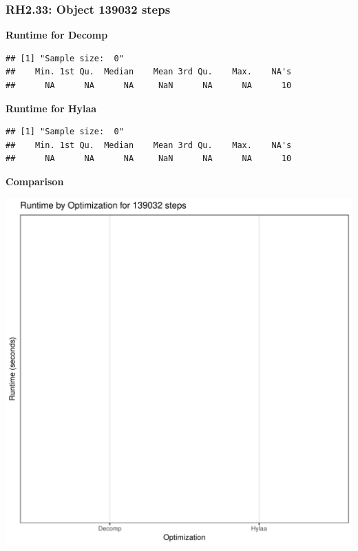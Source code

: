 \documentclass{article}\usepackage[]{graphicx}\usepackage[]{color}
\makeatletter
\def\maxwidth{ %
  \ifdim\Gin@nat@width>\linewidth
    \linewidth
  \else
    \Gin@nat@width
  \fi
}
\newenvironment{kframe}{%
 \def\at@end@of@kframe{}%
 \ifinner\ifhmode%
  \def\at@end@of@kframe{\end{minipage}}%
  \begin{minipage}{\columnwidth}%
 \fi\fi%
 \def\FrameCommand##1{\hskip\@totalleftmargin \hskip-\fboxsep
 \colorbox{shadecolor}{##1}\hskip-\fboxsep
     \hskip-\linewidth \hskip-\@totalleftmargin \hskip\columnwidth}%
 \MakeFramed {\advance\hsize-\width
   \@totalleftmargin\z@ \linewidth\hsize
   \@setminipage}}%
 {\par\unskip\endMakeFramed%
 \at@end@of@kframe}
\newenvironment{knitrout}{}{} %
\makeatother
\begin{document}
\subsubsection{RH2.33: Object 139032 steps}

 \textbf{Runtime for Decomp}
\begin{knitrout}
\color{fgcolor}\begin{kframe}
\begin{verbatim}
## [1] "Sample size:  0"
##    Min. 1st Qu.  Median    Mean 3rd Qu.    Max.    NA's 
##      NA      NA      NA     NaN      NA      NA      10
\end{verbatim}
\end{kframe}
\end{knitrout}
 \textbf{Runtime for Hylaa}
\begin{knitrout}
\color{fgcolor}\begin{kframe}
\begin{verbatim}
## [1] "Sample size:  0"
##    Min. 1st Qu.  Median    Mean 3rd Qu.    Max.    NA's 
##      NA      NA      NA     NaN      NA      NA      10
\end{verbatim}
\end{kframe}
\end{knitrout}
  
 \textbf{Comparison}
  
\begin{knitrout}
\color{fgcolor}
\includegraphics[width=\maxwidth]{figure/RH2_steps139032-1} 

\end{knitrout}
\end{document}
